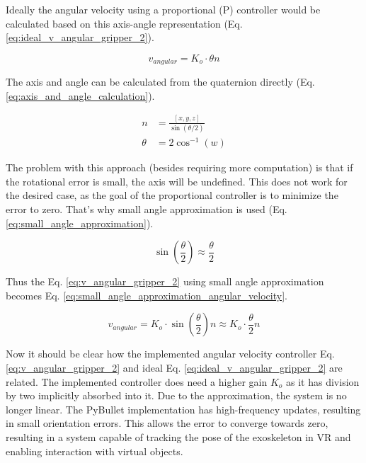 \noindent
Ideally the angular velocity using a proportional (P) controller would be calculated based on this axis-angle representation (Eq. \ref{eq:ideal_v_angular_gripper_2}).

\begin{equation} v_{angular} = K_o \cdot \theta n \label{eq:ideal_v_angular_gripper_2} \end{equation}

\noindent
The axis and angle can be calculated from the quaternion directly (Eq. \ref{eq:axis_and_angle_calculation}).

\begin{equation}
\label{eq:axis_and_angle_calculation}
\begin{aligned}
n &= \frac{[x, y, z]}{\sin(\theta/2)} \\
\theta &= 2 \cos^{-1}(w)
\end{aligned}
\end{equation}

\noindent
The problem with this approach (besides requiring more computation) is that if the rotational error is small, the axis will be undefined. This does not work for the desired case, as the goal of the proportional controller is to minimize the error to zero. That's why small angle approximation is used (Eq. \ref{eq:small_angle_approximation}).

\begin{equation} \sin\left(\frac{\theta}{2}\right) \approx \frac{\theta}{2} \label{eq:small_angle_approximation} \end{equation}

\noindent
Thus the Eq. \ref{eq:v_angular_gripper_2} using small angle approximation becomes Eq. \ref{eq:small_angle_approximation_angular_velocity}.

\begin{equation} v_{angular} = K_o \cdot \sin\left(\frac{\theta}{2}\right)n \approx  K_o \cdot \frac{\theta}{2}n \label{eq:small_angle_approximation_angular_velocity} \end{equation}

\noindent
Now it should be clear how the implemented angular velocity controller Eq. \ref{eq:v_angular_gripper_2} and ideal Eq. \ref{eq:ideal_v_angular_gripper_2} are related. The implemented controller does need a higher gain $K_o$ as it has division by two implicitly absorbed into it. Due to the approximation, the system is no longer linear. The PyBullet implementation has high-frequency updates, resulting in small orientation errors. This allows the error to converge towards zero, resulting in a system capable of tracking the pose of the exoskeleton in VR and enabling interaction with virtual objects.
